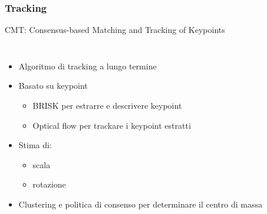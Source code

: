 \documentclass[c]{beamer}
\begin{document}
\begin{frame}
\frametitle{Tracking}

CMT: Consensus-based Matching and Tracking of Keypoints
\begin{columns}[c, onlytextwidth]
\begin{itemize}
 \item Algoritmo di tracking a lungo termine
 \item Basato su keypoint
 \begin{itemize}
  \item BRISK per estrarre e descrivere keypoint
  \item Optical flow per trackare i keypoint estratti
 \end{itemize}
 \item Stima di:
  \begin{itemize}
  \item scala
  \item rotazione
 \end{itemize}
 \item Clustering e politica di consenso per determinare il centro di massa

\end{itemize}
 \\
\vskip 0.5cm

\end{columns}
\end{frame}
\end{document}

